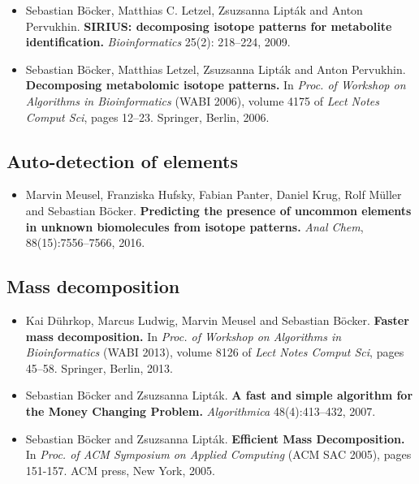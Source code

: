 \documentclass[letterpaper,10pt,openany,oneside]{sphinxmanual}
\begin{document}
\begin{itemize}
\item Sebastian Böcker, Matthias C. Letzel, Zsuzsanna Lipták and Anton
Pervukhin.
\textbf{SIRIUS: decomposing isotope patterns for metabolite identification.}
\emph{Bioinformatics} 25(2): 218--224, 2009.

\item Sebastian Böcker, Matthias Letzel, Zsuzsanna Lipták and Anton Pervukhin.
\textbf{Decomposing metabolomic isotope patterns.}
In \emph{Proc. of Workshop on Algorithms in Bioinformatics} (WABI 2006), volume 4175 of \emph{Lect Notes Comput Sci}, pages 12--23. Springer, Berlin, 2006. 
\end{itemize}


\subsection{Auto-detection of elements}
\label{introduction:auto-detection-of-elements}

\begin{itemize}
\item Marvin Meusel, Franziska Hufsky, Fabian Panter, Daniel Krug, Rolf Müller and Sebastian Böcker.
\textbf{Predicting the presence of uncommon elements in unknown biomolecules from isotope patterns.}
\emph{Anal Chem}, 88(15):7556--7566, 2016. 
\end{itemize}

\subsection{Mass decomposition}
\label{introduction:mass-decomposition}

\begin{itemize}
\item Kai Dührkop, Marcus Ludwig, Marvin Meusel and Sebastian Böcker.
\textbf{Faster mass decomposition.}
In \emph{Proc. of Workshop on Algorithms in Bioinformatics} (WABI 2013), volume 8126 of \emph{Lect Notes Comput Sci}, pages 45--58. Springer, Berlin, 2013.

\item Sebastian Böcker and Zsuzsanna Lipták.
\textbf{A fast and simple algorithm for the Money Changing Problem.}
\emph{Algorithmica} 48(4):413--432, 2007.

\item Sebastian Böcker and Zsuzsanna Lipták.
\textbf{Efficient Mass Decomposition.}
In \emph{Proc. of ACM Symposium on Applied Computing} (ACM SAC 2005), pages 151-157. ACM press, New York, 2005. 
\end{itemize}
\end{document}
